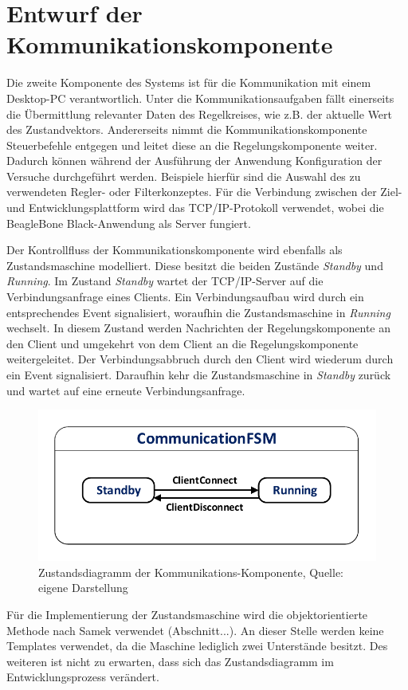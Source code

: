 \section{Entwurf der Kommunikationskomponente}
Die zweite Komponente des Systems ist für die Kommunikation mit einem Desktop-PC verantwortlich. Unter die Kommunikationsaufgaben fällt einerseits die Übermittlung relevanter Daten des Regelkreises, wie z.B. der aktuelle Wert des Zustandvektors. Andererseits nimmt die Kommunikationskomponente Steuerbefehle entgegen und leitet diese an die Regelungskomponente weiter. Dadurch können während der Ausführung der Anwendung Konfiguration der Versuche durchgeführt werden. Beispiele hierfür sind die Auswahl des zu verwendeten Regler- oder Filterkonzeptes. Für die Verbindung zwischen der Ziel- und Entwicklungsplattform wird das TCP/IP-Protokoll verwendet, wobei die BeagleBone Black-Anwendung als Server fungiert.

Der Kontrollfluss der Kommunikationskomponente wird ebenfalls als Zustandsmaschine modelliert. Diese besitzt die beiden Zustände \textit{Standby} und \textit{Running}. Im Zustand \textit{Standby} wartet der TCP/IP-Server auf die Verbindungsanfrage eines Clients. Ein Verbindungsaufbau wird durch ein entsprechendes Event signalisiert, woraufhin die Zustandsmaschine in \textit{Running} wechselt. In diesem Zustand werden Nachrichten der Regelungskomponente an den Client und umgekehrt von dem Client an die Regelungskomponente weitergeleitet. Der Verbindungsabbruch durch den Client wird wiederum durch ein Event signalisiert. Daraufhin kehr die Zustandsmaschine in \textit{Standby} zurück und wartet auf eine erneute Verbindungsanfrage.
\begin{figure}[h!]
\centering
\includegraphics[width=0.7\linewidth]{img/SW_4_CommComp_SC.pdf}
\caption{Zustandsdiagramm der Kommunikations-Komponente, Quelle: eigene Darstellung}
\end{figure}
Für die Implementierung der Zustandsmaschine wird die objektorientierte Methode nach Samek verwendet (Abschnitt...). An dieser Stelle werden keine Templates verwendet, da die Maschine lediglich zwei Unterstände besitzt. Des weiteren ist nicht zu erwarten, dass sich das Zustandsdiagramm im Entwicklungsprozess verändert.

